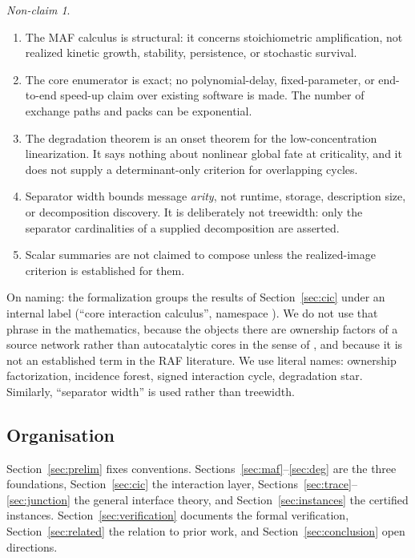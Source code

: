 \documentclass[11pt,a4paper]{article}
\theoremstyle{plain}
\theoremstyle{definition}
\theoremstyle{remark}
\newtheorem{nonclaim}[theorem]{Non-claim}
\begin{document}
\begin{nonclaim}\label{nc:main}
\begin{enumerate}[label=(\alph*)]
\item The MAF calculus is structural: it concerns stoichiometric amplification, not realized kinetic growth, stability, persistence, or stochastic survival.
\item The core enumerator is exact; no polynomial-delay, fixed-parameter, or end-to-end speed-up claim over existing software is made. The number of exchange paths and packs can be exponential.
\item The degradation theorem is an onset theorem for the low-concentration linearization. It says nothing about nonlinear global fate at criticality, and it does not supply a determinant-only criterion for overlapping cycles.
\item Separator width bounds message \emph{arity}, not runtime, storage, description size, or decomposition discovery. It is deliberately not treewidth: only the separator cardinalities of a supplied decomposition are asserted.
\item Scalar summaries are not claimed to compose unless the realized-image criterion is established for them.
\end{enumerate}
\end{nonclaim}

On naming: the formalization groups the results of Section~\ref{sec:cic} under an internal label (``core interaction calculus'', namespace ). We do not use that phrase in the mathematics, because the objects there are ownership factors of a source network rather than autocatalytic cores in the sense of \cite{blokhuis2020,golnik2026cores}, and because it is not an established term in the RAF literature. We use literal names: ownership factorization, incidence forest, signed interaction cycle, degradation star. Similarly, ``separator width'' is used rather than treewidth.

\subsection{Organisation}

Section~\ref{sec:prelim} fixes conventions. Sections~\ref{sec:maf}--\ref{sec:deg} are the three foundations, Section~\ref{sec:cic} the interaction layer, Sections~\ref{sec:trace}--\ref{sec:junction} the general interface theory, and Section~\ref{sec:instances} the certified instances. Section~\ref{sec:verification} documents the formal verification, Section~\ref{sec:related} the relation to prior work, and Section~\ref{sec:conclusion} open directions.
\end{document}
